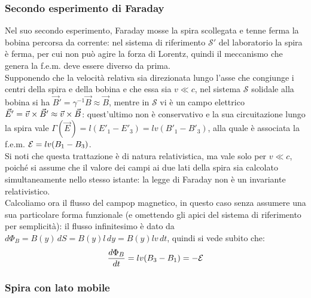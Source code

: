 \subsubsection{Secondo esperimento di Faraday}

Nel suo secondo esperimento, Faraday mosse la spira scollegata e tenne ferma la bobina percorsa da corrente: nel sistema di riferimento $ \mathcal{S}' $ del laboratorio la spira è ferma, per cui non può agire la forza di Lorentz, quindi il meccanismo che genera la f.e.m. deve essere diverso da prima. \\ 
%
Supponendo che la velocità relativa sia direzionata lungo l'asse che congiunge i centri della spira e della bobina e che essa sia $ v \ll c $, nel sistema $ \mathcal{S} $ solidale alla bobina si ha $ \vec{B}' = \gamma^{-1} \vec{B} \approx \vec{B} $, mentre in $ \mathcal{S} $ vi è un campo elettrico $ \vec{E}' = \vec{v}\times\vec{B}' \approx \vec{v}\times\vec{B} $: quest'ultimo non è conservativo e la sua circuitazione lungo la spira vale $ \Gamma(\vec{E}) = l (E'_1 - E'_3) = lv (B'_1 - B'_3) $, alla quale è associata la f.e.m. $ \mathcal{E} = lv (B_1 - B_3) $. \\ 
%
Si noti che questa trattazione è di natura relativistica, ma vale solo per $ v \ll c $, poiché si assume che il valore dei campi ai due lati della spira sia calcolato simultaneamente nello stesso istante: la legge di Faraday non è un invariante relativistico. \\ 
%
Calcoliamo ora il flusso del campop magnetico, in questo caso senza assumere una sua particolare forma funzionale (e omettendo gli apici del sistema di riferimento per semplicità): il flusso infinitesimo è dato da $ d\Phi_B = B(y) \,dS = B(y) l \,dy = B(y) lv \,dt $, quindi si vede subito che:
\begin{equation}
	\frac{d\Phi_B}{dt} = lv (B_3 - B_1) = -\mathcal{E}
	\label{eq:4}
\end{equation}

\subsubsection{Spira con lato mobile}

